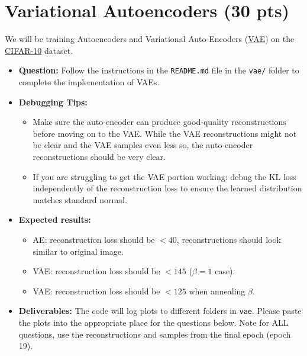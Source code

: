 \documentclass[11pt,addpoints,answers]{exam}
\numberwithin{equation}{section} %
\numberwithin{figure}{section} %
\numberwithin{table}{section} %
\begin{document}
\section{Variational Autoencoders (30 pts)}

We will be training Autoencoders and Variational Auto-Encoders (\href{https://arxiv.org/abs/1312.6114}{VAE}) on the \href{https://www.cs.toronto.edu/~kriz/cifar.html}{CIFAR-10} dataset.

\begin{itemize}
\item \textbf{Question:} Follow the instructions in the \texttt{README.md} file in the \texttt{vae/} folder to complete the implementation of VAEs.
\item \textbf{Debugging Tips:}
    \begin{itemize}
        \item Make sure the auto-encoder can produce good-quality reconstructions before moving on to the VAE. 
        While the VAE reconstructions might not be clear and the VAE samples even less so, the auto-encoder reconstructions should be very clear.
        \item If you are struggling to get the VAE portion working: debug the KL loss independently of the reconstruction loss to ensure the learned distribution matches standard normal. 
    \end{itemize}
\item \textbf{Expected results:}
    \begin{itemize}
        \item AE: reconstruction loss should be $<40$, reconstructions should look similar to original image.
        \item VAE: reconstruction loss should be $< 145$ ($\beta=1$ case).
        \item VAE: reconstruction loss should be $< 125$ when annealing $\beta$.
    \end{itemize}
\item \textbf{Deliverables:} The code will log plots to different folders in \texttt{vae}. Please paste the plots into the appropriate place for the questions below. Note for ALL questions, use the reconstructions and samples from the final epoch (epoch 19). 
\end{itemize}
\newpage
\end{document}
